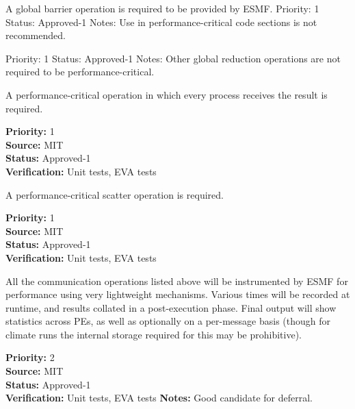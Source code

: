 A global barrier operation is required to be provided by ESMF.
Priority:  1
Status:  Approved-1
Notes:  Use in performance-critical code sections is not recommended.

Priority:  1
Status:  Approved-1
Notes:  Other global reduction operations are not required to be 
performance-critical.

A performance-critical operation in which every process receives the result 
is required.
\begin{reqlist}
{\bf Priority:} 1 \\
{\bf Source:}  MIT \\
{\bf Status:} Approved-1 \\
{\bf Verification:} Unit tests, EVA tests 
\end{reqlist}

A performance-critical scatter operation is required.

\begin{reqlist}
{\bf Priority:} 1 \\
{\bf Source:}  MIT \\
{\bf Status:} Approved-1 \\
{\bf Verification:} Unit tests, EVA tests 
\end{reqlist}


All the communication operations listed above will be instrumented by
ESMF for performance using very lightweight mechanisms. Various times
will be recorded at runtime, and results collated in a post-execution
phase. Final output will show statistics across PEs, as well as
optionally on a per-message basis (though for climate runs the
internal storage required for this may be prohibitive).


\begin{reqlist}
{\bf Priority:} 2 \\
{\bf Source:}  MIT \\
{\bf Status:} Approved-1 \\
{\bf Verification:} Unit tests, EVA tests 
{\bf Notes:} Good candidate for deferral.
\end{reqlist}

